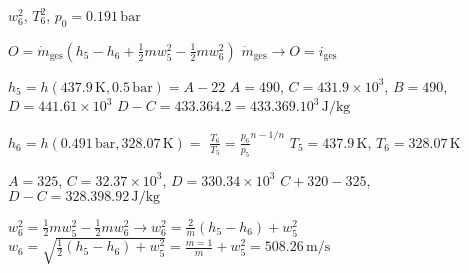 \( w_6^2 \), \( T_6^2 \), \( p_0 = 0.191 \, \text{bar} \)  

\( O = \dot{m}_{\text{ges}} (h_5 - h_6 + \frac{1}{2} m w_5^2 - \frac{1}{2} m w_6^2) \)  
\( \dot{m}_{\text{ges}} \to O = i_{\text{ges}} \)  

\( h_5 = h (437.9 \, \text{K}, 0.5 \, \text{bar}) = A - 22 \)  
\( A = 490 \), \( C = 431.9 \times 10^3 \), \( B = 490 \), \( D = 441.61 \times 10^3 \)  
\( D - C = 433.364.2 = 433.369.10^3 \, \text{J/kg} \)  

\( h_6 = h (0.491 \, \text{bar}, 328.07 \, \text{K}) = \)  
\( \frac{T_6}{T_5} = \frac{p_6}{p_5}^{n-1/n} \)  
\( T_5 = 437.9 \, \text{K} \), \( T_6 = 328.07 \, \text{K} \)  

\( A = 325 \), \( C = 32.37 \times 10^3 \), \( D = 330.34 \times 10^3 \)  
\( C + 320 - 325 \), \( D - C = 328.398.92 \, \text{J/kg} \)  

\( w_6^2 = \frac{1}{2} m w_5^2 - \frac{1}{2} m w_6^2 \to w_6^2 = \frac{2}{m} (h_5 - h_6) + w_5^2 \)  
\( w_6 = \sqrt{\frac{1}{2} (h_5 - h_6) + w_5^2} = \frac{m = 1}{m} + w_5^2 = 508.26 \, \text{m/s} \)